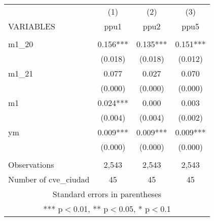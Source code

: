 \begin{tabular}{lccc} \hline
 & (1) & (2) & (3) \\
VARIABLES & ppu1 & ppu2 & ppu5 \\ \hline
 &  &  &  \\
m1\_20 & 0.156*** & 0.135*** & 0.151*** \\
 & (0.018) & (0.018) & (0.012) \\
m1\_21 & 0.077 & 0.027 & 0.070 \\
 & (0.000) & (0.000) & (0.000) \\
m1 & 0.024*** & 0.000 & 0.003 \\
 & (0.004) & (0.004) & (0.002) \\
ym & 0.009*** & 0.009*** & 0.009*** \\
 & (0.000) & (0.000) & (0.000) \\
 &  &  &  \\
Observations & 2,543 & 2,543 & 2,543 \\
 Number of cve\_ciudad & 45 & 45 & 45 \\ \hline
\multicolumn{4}{c}{ Standard errors in parentheses} \\
\multicolumn{4}{c}{ *** p$<$0.01, ** p$<$0.05, * p$<$0.1} \\
\end{tabular}
